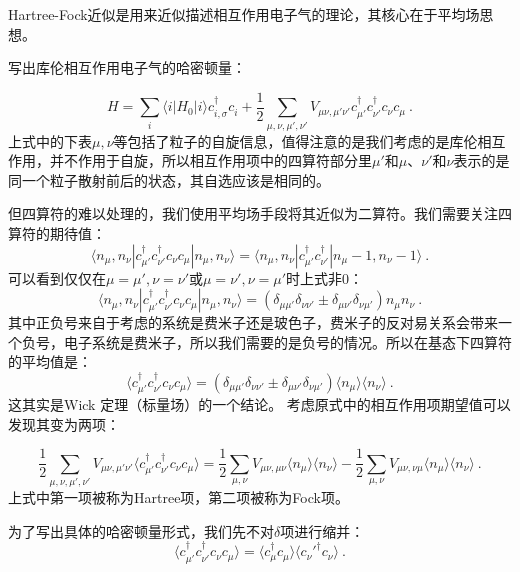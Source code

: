 
Hartree-Fock近似是用来近似描述相互作用电子气的理论，其核心在于平均场思想。

写出库伦相互作用电子气的哈密顿量：

$$H=\sum\limits_{i}\langle i|H_0|i\rangle c_{i,\sigma}^\dagger c_{i}^~+\frac{1}{2}\sum\limits_{\mu ,\nu,\mu', \nu'}V_{\mu \nu,\mu' \nu'}c_{\mu'}^\dagger c_{\nu'}^\dagger c_{\nu}^~ c_{\mu}^~~. $$
上式中的下表$\mu,\nu$等包括了粒子的自旋信息，值得注意的是我们考虑的是库伦相互作用，并不作用于自旋，所以相互作用项中的四算符部分里$\mu'$和$\mu$、$\nu'$和$\nu$表示的是同一个粒子散射前后的状态，其自选应该是相同的。

但四算符的难以处理的，我们使用平均场手段将其近似为二算符。我们需要关注四算符的期待值：
$$
\langle n_\mu, n_\nu |c_{\mu'}^\dagger c_{\nu'}^\dagger c_{\nu}^~ c_{\mu}^~ |n_\mu ,n_\nu \rangle = \langle n_\mu, n_\nu |c_{\mu'}^\dagger c_{\nu'}^\dagger |n_\mu-1 ,n_\nu-1 \rangle~.
$$
可以看到仅仅在$\mu=\mu',\nu=\nu'$或$\mu=\nu',\nu=\mu'$时上式非0：
$$\langle n_\mu, n_\nu |c_{\mu'}^\dagger c_{\nu'}^\dagger c_{\nu}^~ c_{\mu}^~ |n_\mu ,n_\nu \rangle = \left(\delta_{\mu\mu'}\delta_{\nu\nu'}\pm \delta_{\mu\nu'}\delta_{\nu\mu'}\right)n_\mu n_\nu~.$$
其中正负号来自于考虑的系统是费米子还是玻色子，费米子的反对易关系会带来一个负号，电子系统是费米子，所以我们需要的是负号的情况。所以在基态下四算符的平均值是：
$$\langle c_{\mu'}^\dagger c_{\nu'}^\dagger c_{\nu}^~ c_{\mu}^~ \rangle = \left(\delta_{\mu\mu'}\delta_{\nu\nu'}\pm \delta_{\mu\nu'}\delta_{\nu\mu'}\right)\langle n_\mu\rangle \langle n_\nu\rangle~.$$
这其实是Wick 定理（标量场）的一个结论。
考虑原式中的相互作用项期望值可以发现其变为两项：

$$\frac{1}{2}\sum\limits_{\mu ,\nu,\mu', \nu'}V_{\mu \nu,\mu' \nu'}\langle c_{\mu'}^\dagger c_{\nu'}^\dagger c_{\nu}^~ c_{\mu}^~\rangle=\frac{1}{2}\sum\limits_{\mu,\nu}V_{\mu\nu,\mu\nu}\langle n_\mu\rangle \langle n_\nu\rangle-\frac{1}{2}\sum\limits_{\mu,\nu}V_{\mu\nu,\nu\mu}\langle n_\mu\rangle \langle n_\nu\rangle~.$$
上式中第一项被称为Hartree项，第二项被称为Fock项。

为了写出具体的哈密顿量形式，我们先不对$\delta$项进行缩并：
$$\langle c_{\mu'}^\dagger c_{\nu'}^\dagger c_{\nu}^~ c_{\mu}^~ \rangle = \langle c_\mu^\dagger c_\mu^~\rangle\langle c_\nu'^\dagger c_\nu^~\rangle~.$$